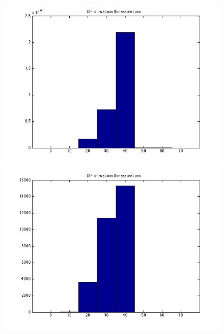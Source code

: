 \documentclass[10pt,conference]{IEEEtran}
\begin{document}
\begin{figure}[htbp]
\centering
\begin{minipage}[t]{0.2\textwidth}
	\centering
	\includegraphics[scale=0.2]{pathloss0-1}
\end{minipage}
\begin{minipage}[t]{0.2\textwidth}
	\centering
	\includegraphics[scale=0.2]{pathloss0-2}
\end{minipage}
\begin{minipage}[t]{0.2\textwidth}
	\centering

\end{minipage}
\end{figure}
\end{document}
